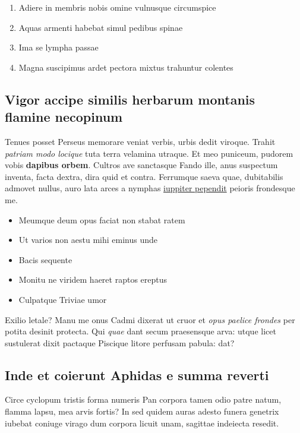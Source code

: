 \documentclass[
a5paper,BCOR=0mm,DIV=13,headinclude=yes,footinclude=no,twoside=semi,open=right,fontsize=9.5pt]{scrartcl}
\providecommand{\tightlist}{%
  \setlength{\itemsep}{0pt}\setlength{\parskip}{0pt}}
\begin{document}
\begin{enumerate}
\def\labelenumi{\arabic{enumi}.}
\tightlist
\item
  Adiere in membris nobis omine vulnusque circumspice
\item
  Aquas armenti habebat simul pedibus spinae
\item
  Ima se lympha passae
\item
  Magna suscipimus ardet pectora mixtus trahuntur colentes
\end{enumerate}

\subsection{Vigor accipe similis herbarum montanis flamine
necopinum}\label{vigor-accipe-similis-herbarum-montanis-flamine-necopinum}

Tenues posset Perseus memorare veniat verbis, urbis dedit viroque.
Trahit \emph{patriam modo locique} tuta terra velamina utraque. Et meo
puniceum, pudorem vobis \textbf{dapibus orbem}. Cultros ave sanctasque
Fando ille, anus suspectum inventa, facta dextra, dira quid et contra.
Ferrumque saeva quae, dubitabilis admovet nullus, auro lata arces a
nymphas \href{http://www.tot.net/}{iuppiter pependit} peioris frondesque
me.

\begin{itemize}
\tightlist
\item
  Meumque deum opus faciat non stabat ratem
\item
  Ut varios non aestu mihi eminus unde
\item
  Bacis sequente
\item
  Monitu ne viridem haeret raptos ereptus
\item
  Culpatque Triviae umor
\end{itemize}

Exilio letale? Manu me onus Cadmi dixerat ut cruor et \emph{opus paelice
frondes} per potita desinit protecta. Qui \emph{quae} dant secum
praesensque arva: utque licet sustulerat dixit pactaque Piscique litore
perfusam pabula: dat?

\subsection{Inde et coierunt Aphidas e summa
reverti}\label{inde-et-coierunt-aphidas-e-summa-reverti}

Circe cyclopum tristis forma numeris Pan corpora tamen odio patre natum,
flamma lapsu, mea arvis fortis? In sed quidem auras adesto funera
genetrix iubebat coniuge virago dum corpora licuit unam, sagittae
indeiecta resedit.
\end{document}
